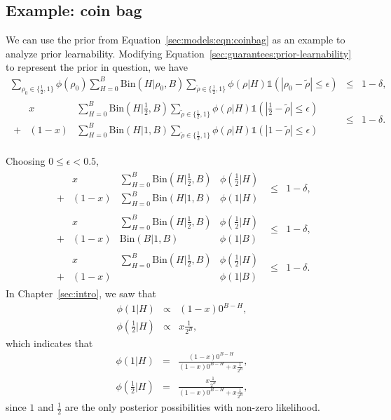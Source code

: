 \subsection{Example: coin bag}

We can use the prior from Equation~\ref{sec:models:eqn:coinbag} as an example to analyze prior learnability. Modifying Equation~\ref{sec:guarantees:prior-learnability} to represent the prior in question, we have
\begin{eqnarray}
\label{sec:guarantees:coin-bag-learnability}
\sum_{\rho_0 \in \{\frac 1 2, 1\}}
 \phi(\rho_0)
 \sum_{H=0}^B
  \mbox{Bin}(H|\rho_0,B)
  \sum_{\tilde \rho \in \{\frac 1 2, 1\}}
   \phi(\rho|H)
   \mathbb{1}(|\rho_0-\tilde\rho|\leq\epsilon)
&\leq& 1-\delta,\\
%
\begin{array}{lrl}
&x&
 \sum_{H=0}^B
  \mbox{Bin}(H|\frac 1 2,B)
  \sum_{\tilde \rho \in \{\frac 1 2, 1\}}
   \phi(\rho|H)
   \mathbb{1}(|\frac 1 2-\tilde\rho|\leq\epsilon)\\ 
+&(1-x)&
 \sum_{H=0}^B
  \mbox{Bin}(H|1,B)
  \sum_{\tilde \rho \in \{\frac 1 2, 1\}}
   \phi(\rho|H)
   \mathbb{1}(|1-\tilde\rho|\leq\epsilon)
\end{array}
&\leq& 1-\delta.
\end{eqnarray}

Choosing $0 \leq \epsilon < 0.5$,
\begin{eqnarray}
%
\begin{array}{lrll}
&x&
 \sum_{H=0}^B
  \mbox{Bin}(H|\frac 1 2,B)&
   \phi(\frac 1 2|H)\\ 
+&(1-x)&
 \sum_{H=0}^B
  \mbox{Bin}(H|1,B)&
   \phi(1|H)
\end{array}
&\leq& 1-\delta,\\
%
\begin{array}{lrll}
&x&
 \sum_{H=0}^B
  \mbox{Bin}(H|\frac 1 2,B)&
   \phi(\frac 1 2|H)\\ 
+&(1-x)&
  \mbox{Bin}(B|1,B)&
   \phi(1|B)
\end{array}
&\leq& 1-\delta,\\
%
\label{sec:guarantees:coinbag-learnability-leaveoff}
\begin{array}{lrll}
&x&
 \sum_{H=0}^B
  \mbox{Bin}(H|\frac 1 2,B)&
   \phi(\frac 1 2|H)\\ 
+&(1-x)&
  &
   \phi(1|B)
\end{array}
&\leq& 1-\delta.
\end{eqnarray}
%
%
In Chapter~\ref{sec:intro}, we saw that
\begin{eqnarray}
\phi(1|H) &\propto& (1-x)0^{B-H},\\
\phi(\frac 1 2|H) &\propto& x \frac 1 {2^B},
\end{eqnarray}
which indicates that
\begin{eqnarray}
\phi(1|H) &=& \frac
{(1-x)0^{B-H}}
{(1-x)0^{B-H}+x \frac 1 {2^B}},\\
\phi(\frac 1 2|H) &=& \frac
{x \frac 1 {2^B}}
{(1-x)0^{B-H}+x \frac 1 {2^B}},
\end{eqnarray}
since $1$ and $\frac 1 2$ are the only posterior possibilities with non-zero likelihood.


